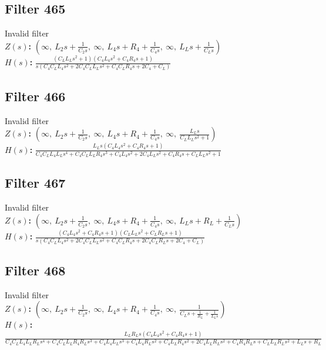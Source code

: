 \documentclass{article}
\begin{document}
\subsection*{Filter 465}
Invalid filter \\ 
\textbf{$Z(s)$:} $\left( \infty, \  L_{2} s + \frac{1}{C_{2} s}, \  \infty, \  L_{4} s + R_{4} + \frac{1}{C_{4} s}, \  \infty, \  L_{L} s + \frac{1}{C_{L} s}\right)$ \\ 
\textbf{$H(s)$:} $\frac{\left(C_{L} L_{L} s^{2} + 1\right) \left(C_{4} L_{4} s^{2} + C_{4} R_{4} s + 1\right)}{s \left(C_{4} C_{L} L_{4} s^{2} + 2 C_{4} C_{L} L_{L} s^{2} + C_{4} C_{L} R_{4} s + 2 C_{4} + C_{L}\right)}$ \\ 
\subsection*{Filter 466}
Invalid filter \\ 
\textbf{$Z(s)$:} $\left( \infty, \  L_{2} s + \frac{1}{C_{2} s}, \  \infty, \  L_{4} s + R_{4} + \frac{1}{C_{4} s}, \  \infty, \  \frac{L_{L} s}{C_{L} L_{L} s^{2} + 1}\right)$ \\ 
\textbf{$H(s)$:} $\frac{L_{L} s \left(C_{4} L_{4} s^{2} + C_{4} R_{4} s + 1\right)}{C_{4} C_{L} L_{4} L_{L} s^{4} + C_{4} C_{L} L_{L} R_{4} s^{3} + C_{4} L_{4} s^{2} + 2 C_{4} L_{L} s^{2} + C_{4} R_{4} s + C_{L} L_{L} s^{2} + 1}$ \\ 
\subsection*{Filter 467}
Invalid filter \\ 
\textbf{$Z(s)$:} $\left( \infty, \  L_{2} s + \frac{1}{C_{2} s}, \  \infty, \  L_{4} s + R_{4} + \frac{1}{C_{4} s}, \  \infty, \  L_{L} s + R_{L} + \frac{1}{C_{L} s}\right)$ \\ 
\textbf{$H(s)$:} $\frac{\left(C_{4} L_{4} s^{2} + C_{4} R_{4} s + 1\right) \left(C_{L} L_{L} s^{2} + C_{L} R_{L} s + 1\right)}{s \left(C_{4} C_{L} L_{4} s^{2} + 2 C_{4} C_{L} L_{L} s^{2} + C_{4} C_{L} R_{4} s + 2 C_{4} C_{L} R_{L} s + 2 C_{4} + C_{L}\right)}$ \\ 
\subsection*{Filter 468}
Invalid filter \\ 
\textbf{$Z(s)$:} $\left( \infty, \  L_{2} s + \frac{1}{C_{2} s}, \  \infty, \  L_{4} s + R_{4} + \frac{1}{C_{4} s}, \  \infty, \  \frac{1}{C_{L} s + \frac{1}{R_{L}} + \frac{1}{L_{L} s}}\right)$ \\ 
\textbf{$H(s)$:} $\frac{L_{L} R_{L} s \left(C_{4} L_{4} s^{2} + C_{4} R_{4} s + 1\right)}{C_{4} C_{L} L_{4} L_{L} R_{L} s^{4} + C_{4} C_{L} L_{L} R_{4} R_{L} s^{3} + C_{4} L_{4} L_{L} s^{3} + C_{4} L_{4} R_{L} s^{2} + C_{4} L_{L} R_{4} s^{2} + 2 C_{4} L_{L} R_{L} s^{2} + C_{4} R_{4} R_{L} s + C_{L} L_{L} R_{L} s^{2} + L_{L} s + R_{L}}$ \\ 
\end{document}
